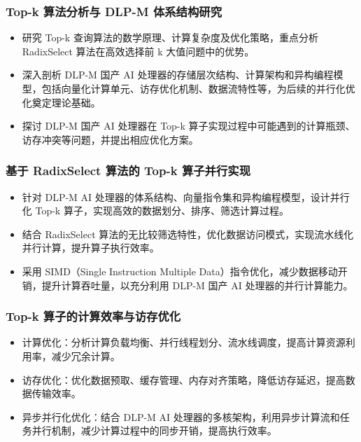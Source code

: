 \subsubsection{Top-k 算法分析与 DLP-M 体系结构研究}
\begin{itemize}
    \item 研究 Top-k 查询算法的数学原理、计算复杂度及优化策略，重点分析 RadixSelect 算法在高效选择前 k 大值问题中的优势。
    \item 深入剖析 DLP-M 国产 AI 处理器的存储层次结构、计算架构和异构编程模型，包括向量化计算单元、访存优化机制、数据流特性等，为后续的并行化优化奠定理论基础。
    \item 探讨 DLP-M 国产 AI 处理器在 Top-k 算子实现过程中可能遇到的计算瓶颈、访存冲突等问题，并提出相应优化方案。
\end{itemize}

\subsubsection{基于 RadixSelect 算法的 Top-k 算子并行实现}
\begin{itemize}
    \item 针对 DLP-M AI 处理器的体系结构、向量指令集和异构编程模型，设计并行化 Top-k 算子，实现高效的数据划分、排序、筛选计算过程。
    \item 结合 RadixSelect 算法的无比较筛选特性，优化数据访问模式，实现流水线化并行计算，提升算子执行效率。
    \item 采用 SIMD（Single Instruction Multiple Data）指令优化，减少数据移动开销，提升计算吞吐量，以充分利用 DLP-M 国产 AI 处理器的并行计算能力。
\end{itemize}

\subsubsection{Top-k 算子的计算效率与访存优化}
\begin{itemize}
    \item 计算优化：分析计算负载均衡、并行线程划分、流水线调度，提高计算资源利用率，减少冗余计算。
    \item 访存优化：优化数据预取、缓存管理、内存对齐策略，降低访存延迟，提高数据传输效率。
    \item 异步并行化优化：结合 DLP-M AI 处理器的多核架构，利用异步计算流和任务并行机制，减少计算过程中的同步开销，提高执行效率。
\end{itemize}

